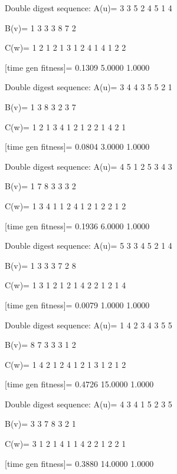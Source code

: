Double digest sequence:
A(u)=
     3     3     5     2     4     5     1     4

B(v)=
     1     3     3     3     8     7     2

C(w)=
     1     2     1     2     1     3     1     2     4     1     4     1     2     2

[time gen fitness]=
    0.1309    5.0000    1.0000

Double digest sequence:
A(u)=
     3     4     4     3     5     5     2     1

B(v)=
     1     3     8     3     2     3     7

C(w)=
     1     2     1     3     4     1     2     1     2     2     1     4     2     1

[time gen fitness]=
    0.0804    3.0000    1.0000

Double digest sequence:
A(u)=
     4     5     1     2     5     3     4     3

B(v)=
     1     7     8     3     3     3     2

C(w)=
     1     3     4     1     1     2     4     1     2     1     2     2     1     2

[time gen fitness]=
    0.1936    6.0000    1.0000

Double digest sequence:
A(u)=
     5     3     3     4     5     2     1     4

B(v)=
     1     3     3     3     7     2     8

C(w)=
     1     3     1     2     1     2     1     4     2     2     1     2     1     4

[time gen fitness]=
    0.0079    1.0000    1.0000

Double digest sequence:
A(u)=
     1     4     2     3     4     3     5     5

B(v)=
     8     7     3     3     3     1     2

C(w)=
     1     4     2     1     2     4     1     2     1     3     1     2     1     2

[time gen fitness]=
    0.4726   15.0000    1.0000

Double digest sequence:
A(u)=
     4     3     4     1     5     2     3     5

B(v)=
     3     3     7     8     3     2     1

C(w)=
     3     1     2     1     4     1     1     4     2     2     1     2     2     1

[time gen fitness]=
    0.3880   14.0000    1.0000

